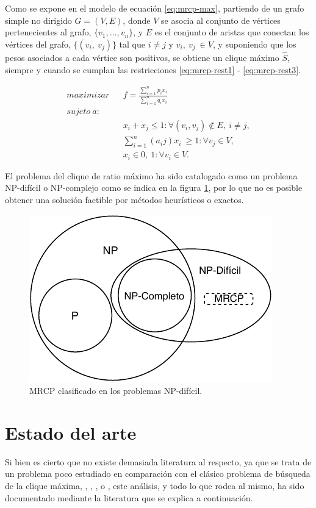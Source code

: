 Como se expone en el modelo de ecuación \ref{eq:mrcp-max}, partiendo de un grafo simple no dirigido $G=(V, E)$, donde $V$ se asocia al conjunto de vértices pertenecientes al grafo, $\{v_1,\dots,v_n\}$, y $E$ es el conjunto de aristas que conectan los vértices del grafo, $\{(v_i,~v_j)\}$ tal que $i \neq j$ y $v_i,~v_j~\in V$, y suponiendo que los pesos asociados a cada vértice son positivos, se obtiene un clique máximo $\widehat{S}$, siempre y cuando se cumplan las restricciones \ref{eq:mrcp-rest1} - \ref{eq:mrcp-rest3}.

\begin{eqnarray}
\label{eq:mrcp-max} 
maximizar && f = \frac{\sum_{i=1}^{n}p_ix_i}{\sum_{i=1}^{n}q_ix_i} \\
\nonumber sujeto ~ a: \\
\label{eq:mrcp-rest1}
&& x_i + x_j \leqslant 1: \forall (v_i, v_j) \notin E,~i \neq j,\\
\label{eq:mrcp-rest2}
&& \sum_{i=1}^{n}(a_ij)x_i ~ \geqslant 1: \forall v_j \in V, \\
\label{eq:mrcp-rest3}
&& x_i \in {0,~1}: \forall v_i \in V.
\end{eqnarray}

El problema del clique de ratio máximo ha sido catalogado como un problema NP-difícil o NP-complejo como se indica en la figura \ref{fig:np-dificil}, por lo que no es posible obtener una solución factible por métodos heurísticos o exactos.

\begin{figure}[H]
	\centering
	\includegraphics{Figures/problemas-np-hard.pdf}
	\caption{MRCP clasificado en los problemas NP-difícil.}
	\label{fig:np-dificil}
\end{figure}

\section{Estado del arte}
Si bien es cierto que no existe demasiada literatura al respecto, ya que se trata de un problema poco estudiado en comparación con el clásico problema de búsqueda de la clique máxima, \cite{mcp-batsyn}, \cite{mcp-ryp}, \cite{mcp-neuro}, o \cite{mcp-ants}, este análisis, y todo lo que rodea al mismo, ha sido documentado mediante la literatura que se explica a continuación. 

